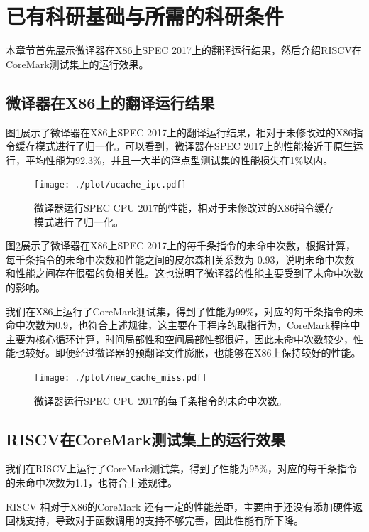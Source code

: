 \documentclass{Style/ucasproposal}%
\begin{document}
\section{已有科研基础与所需的科研条件}

本章节首先展示微译器在X86上SPEC 2017上的翻译运行结果，然后介绍RISCV在CoreMark测试集上的运行效果。

\subsection{微译器在X86上的翻译运行结果}

图\ref{img:ucache_ipc}展示了微译器在X86上SPEC 2017上的翻译运行结果，相对于未修改过的X86指令缓存模式进行了归一化。可以看到，微译器在SPEC 2017上的性能接近于原生运行，平均性能为92.3\%，并且一大半的浮点型测试集的性能损失在1\%以内。

\begin{figure}[h]
  \centering
  \texttt{[image: ./plot/ucache\_ipc.pdf]}
  \caption{微译器运行SPEC CPU 2017的性能，相对于未修改过的X86指令缓存模式进行了归一化。}
  \label{img:ucache_ipc}
\end{figure}

图\ref{img:new_cache_miss}展示了微译器在X86上SPEC 2017上的每千条指令的未命中次数，根据计算，每千条指令的未命中次数和性能之间的皮尔森相关系数为-0.93，说明未命中次数和性能之间存在很强的负相关性。这也说明了微译器的性能主要受到了未命中次数的影响。

我们在X86上运行了CoreMark测试集，得到了性能为99\%，对应的每千条指令的未命中次数为0.9，也符合上述规律，这主要在于程序的取指行为，CoreMark程序中主要为核心循环计算，时间局部性和空间局部性都很好，因此未命中次数较少，性能也较好。即便经过微译器的预翻译文件膨胀，也能够在X86上保持较好的性能。

\begin{figure}[h]
  \centering
  \texttt{[image: ./plot/new\_cache\_miss.pdf]}
  \caption{微译器运行SPEC CPU 2017的每千条指令的未命中次数。}
  \label{img:new_cache_miss}
\end{figure}

\subsection{RISCV在CoreMark测试集上的运行效果}

我们在RISCV上运行了CoreMark测试集，得到了性能为95\%，对应的每千条指令的未命中次数为1.1，也符合上述规律。

RISCV 相对于X86的CoreMark 还有一定的性能差距，主要由于还没有添加硬件返回栈支持，导致对于函数调用的支持不够完善，因此性能有所下降。
\end{document}
